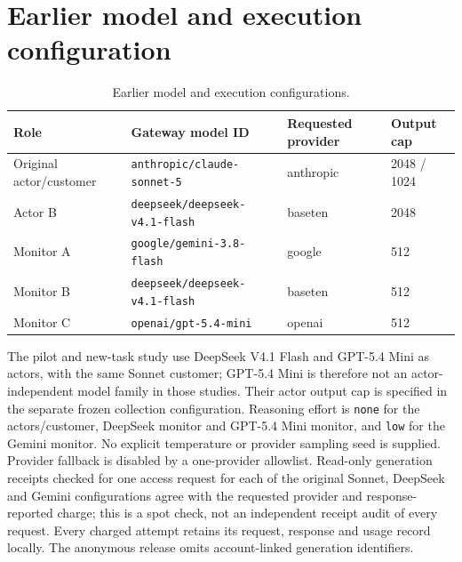 \section{Earlier model and execution configuration}
\label{app:configuration}
\begin{table}[h]
\caption{Earlier model and execution configurations.}\label{tab:earlier-config}
\centering\small
\begin{tabular}{llll}
\toprule
Role & Gateway model ID & Requested provider & Output cap\\
\midrule
Original actor/customer & \texttt{anthropic/claude-sonnet-5} & anthropic & 2048 / 1024\\
Actor B & \texttt{deepseek/deepseek-v4.1-flash} & baseten & 2048\\
Monitor A & \texttt{google/gemini-3.8-flash} & google & 512\\
Monitor B & \texttt{deepseek/deepseek-v4.1-flash} & baseten & 512\\
Monitor C & \texttt{openai/gpt-5.4-mini} & openai & 512\\
\bottomrule
\end{tabular}
\end{table}
The pilot and new-task study use DeepSeek V4.1 Flash and GPT-5.4 Mini as actors, with the same Sonnet customer; GPT-5.4 Mini is therefore not an actor-independent model family in those studies. Their actor output cap is specified in the separate frozen collection configuration. Reasoning effort is \texttt{none} for the actors/customer, DeepSeek monitor and GPT-5.4 Mini monitor, and \texttt{low} for the Gemini monitor. No explicit temperature or provider sampling seed is supplied. Provider fallback is disabled by a one-provider allowlist. Read-only generation receipts checked for one access request for each of the original Sonnet, DeepSeek and Gemini configurations agree with the requested provider and response-reported charge; this is a spot check, not an independent receipt audit of every request. Every charged attempt retains its request, response and usage record locally. The anonymous release omits account-linked generation identifiers.

